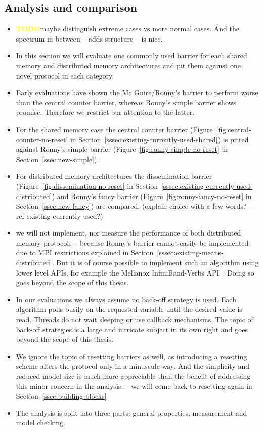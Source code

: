 \documentclass[a4paper, 10pt]{article}
\def \todo{\textbf{\textcolor{yellow}{TODO}}}
\begin{document}
\begin{enumerate}
\section{Analysis and comparison}
\label{sec:analysis}
\begin{itemize}
	\item \todo maybe distinguish extreme cases vs more normal cases. And the spectrum in between -- adds structure -- is nice.
	\item In this section we will evaluate one commonly used barrier for each shared memory and distributed memory architectures and pit them against one novel protocol in each category.
	\item Early evaluations have shown the Mc Guire/Ronny's barrier to perform worse than the central counter barrier, whereas Ronny's simple barrier shows promise. Therefore we restrict our attention to the latter.
	\item For the shared memory case the central counter barrier (Figure~\ref{fig:central-counter-no-reset} in Section~\ref{sssec:existing-currently-used-shared}) is pitted against Ronny's simple barrier (Figure~\ref{fig:ronny-simple-no-reset} in Section~\ref{ssec:new-simple}).
	\item For distributed memory architectures the dissemination barrier (Figure~\ref{fig:dissemination-no-reset} in Section~\ref{sssec:existing-currently-used-distributed}) and Ronny's fancy barrier (Figure~\ref{fig:ronny-fancy-no-reset} in Section~\ref{ssec:new-fancy}) are compared. (explain choice with a few words? -- ref existing-currently-used?)
	\item we will not implement, nor measure the performance of both distributed memory protocols -- because Ronny's barrier cannot easily be implemented due to MPI restrictions explained in Section~\ref{sssec:existing-means-distributed}. But it is of course possible to implement such an algorithm using lower level APIs, for example the Mellanox InfiniBand-Verbs API~\cite{mellanox}. Doing so goes beyond the scope of this thesis.
	\item In our evaluations we always assume no back-off strategy is used. Each algorithm polls busily on the requested variable until the desired value is read. Threads do not wait sleeping or use callback mechanisms. The topic of back-off strategies is a large and intricate subject in its own right and goes beyond the scope of this thesis.
	\item We ignore the topic of resetting barriers as well, as introducing a resetting scheme alters the protocol only in a minuscule way. And the simplicity and reduced model size is much more appreciable than the benefit of addressing this minor concern in the analysis. -- we will come back to resetting again in Section~\ref{ssec:building-blocks}
	\item The analysis is split into three parts: general properties, measurement and model checking.
\end{itemize}


\end{enumerate}
\end{document}
